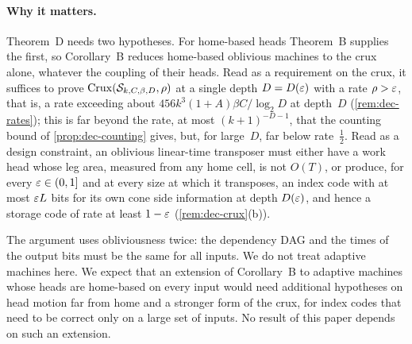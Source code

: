 \paragraph{Why it matters.} Theorem~D needs two hypotheses. For home-based heads Theorem~B supplies the first, so
Corollary~B reduces home-based oblivious machines to the crux alone, whatever the coupling of their heads. Read as a
requirement on the crux, it suffices to prove $\mathrm{Crux}(\mathcal S_{k,C,\beta,D},\rho)$ at a single depth $D=D(\varepsilon)$
with a rate $\rho>\varepsilon$, that is, a rate exceeding about $456k^3(1+A)\beta C/\log_2D$ at depth~$D$ (\cref{rem:dec-rates});
this is far beyond the rate, at most $(k+1)^{-D-1}$, that the counting bound of \cref{prop:dec-counting} gives, but, for large~$D$, far below
rate~$\tfrac12$. Read as a design constraint, an oblivious linear-time transposer must either have a work head whose
leg area, measured from any home cell, is not $O(T)$, or produce, for every $\varepsilon\in(0,1]$ and at every size at which it transposes, an index
code with at most $\varepsilon L$ bits for its own cone side information at depth $D(\varepsilon)$, and hence a storage code of
rate at least $1-\varepsilon$ (\cref{rem:dec-crux}(b)).

\begin{remark}\label{rem:dec-adaptive}
The argument uses obliviousness twice: the dependency DAG and the times of the output bits must be the same for all
inputs. We do not treat adaptive machines here. We expect that an extension of Corollary~B to adaptive machines whose heads are
home-based on every input would need additional hypotheses on head motion far from home and a stronger form of the
crux, for index codes that need to be correct only on a large set of inputs. No result of this paper depends on such an extension.
\end{remark}
